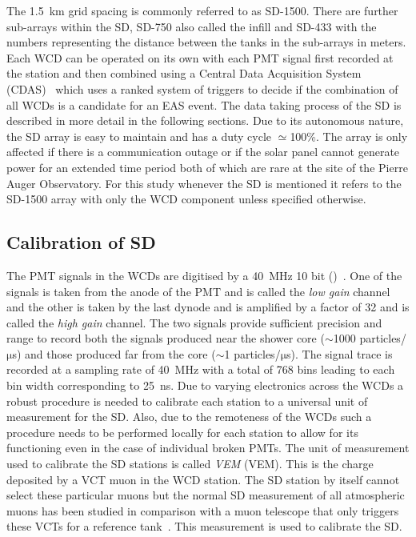 The 1.5 km grid spacing is commonly referred to as SD-1500. There are further sub-arrays within the SD, SD-750 also called the infill and SD-433 with the numbers representing the distance between the tanks in the sub-arrays in meters. Each WCD can be operated on its own with each PMT signal first recorded at the station and then combined using a Central Data Acquisition System (CDAS)~\cite{Auger:2015} which uses a ranked system of triggers to decide if the combination of all WCDs is a candidate for an EAS event. The data taking process of the SD is described in more detail in the following sections. Due to its autonomous nature, the SD array is easy to maintain and has a duty cycle $\simeq$100\%. The array is only affected if there is a communication outage or if the solar panel cannot generate power for an extended time period both of which are rare at the site of the Pierre Auger Observatory. For this study whenever the SD is mentioned it refers to the SD-1500 array with only the WCD component unless specified otherwise.     

\subsection{Calibration of SD}
\label{sec:Sur_det_calib}

The PMT signals in the WCDs are digitised by a 40 MHz 10 bit \textit{} ()~\cite{PierreAuger:2005znw}. One of the signals is taken from the anode of the PMT and is called the \textit{low gain} channel and the other is taken by the last dynode and is amplified by a factor of 32 and is called the \textit{high gain} channel. The two signals provide sufficient precision and range to record both the signals produced near the shower core ($\sim$1000 particles/$\mathrm{\mu}$s) and those produced far from the core ($\sim$1 particles/$\mathrm{\mu}$s). The signal trace is recorded at a sampling rate of 40 MHz with a total of 768 bins leading to each bin width corresponding to 25 ns. Due to varying electronics across the WCDs a robust procedure is needed to calibrate each station to a universal unit of measurement for the SD. Also, due to the remoteness of the WCDs such a procedure needs to be performed locally for each station to allow for its functioning even in the case of individual broken PMTs. The unit of measurement used to calibrate the SD stations is called \textit{\acrlong{VEM}} (\acrshort{VEM}). This is the charge deposited by a \gls{VCT} muon in the WCD station. The SD station by itself cannot select these particular muons but the normal SD measurement of all atmospheric muons has been studied in comparison with a muon telescope that only triggers these VCTs for a reference tank~\cite{PierreAuger:2005cju}. This measurement is used to calibrate the SD.

